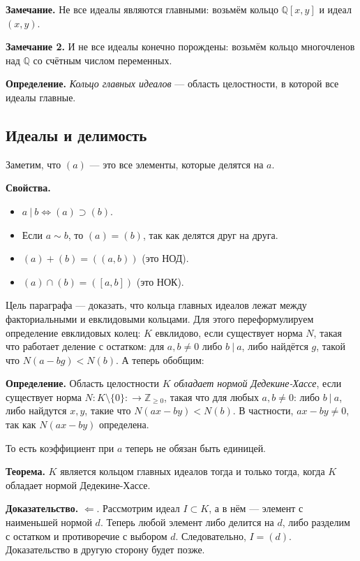 \textbf{Замечание.} Не все идеалы являются главными: возьмём кольцо $\mathbb Q[x, y]$ и идеал $(x, y)$.

\textbf{Замечание 2.} И не все идеалы конечно порождены: возьмём кольцо многочленов над $\mathbb Q$ со счётным числом переменных.

\textbf{Определение.} \textit{Кольцо главных идеалов} --- область целостности, в которой все идеалы главные.

\subsection{Идеалы и делимость}
Заметим, что $(a)$ --- это все элементы, которые делятся на $a$.

\textbf{Свойства.}
\begin{itemize}
    \item $a~|~b \iff (a) \supset (b)$.
    \item Если $a \sim b$, то $(a) = (b)$, так как делятся друг на друга.
    \item $(a) + (b) = ((a, b))$ (это НОД).
    \item $(a) \cap (b) = ([a, b])$ (это НОК).
\end{itemize}

Цель параграфа --- доказать, что кольца главных идеалов лежат между факториальными и евклидовыми кольцами.
Для этого переформулируем определение евклидовых колец: $K$ евклидово, если существует норма $N$, такая что работает деление с остатком: для $a, b \ne 0$ либо $b~|~a$, либо найдётся $g$, такой что $N(a - bg) < N(b)$.
А теперь обобщим:

\textbf{Определение.} Область целостности $K$ \textit{обладает нормой Дедекине-Хассе}, если существует норма $N: K \setminus \{0\}: \to \mathbb Z_{\ge 0}$, такая что для любых $a, b \ne 0$: либо $b~|~a$, либо найдутся $x, y$, такие что $N(ax - by) < N(b)$.
В частности, $ax - by \ne 0$, так как $N(ax - by)$ определена.

То есть коэффициент при $a$ теперь не обязан быть единицей.

\textbf{Теорема.} $K$ является кольцом главных идеалов тогда и только тогда, когда $K$ обладает нормой Дедекине-Хассе.

\textbf{Доказательство.} $\Leftarrow$. Рассмотрим идеал $I \subset K$, а в нём --- элемент с наименьшей нормой $d$.
Теперь любой элемент либо делится на $d$, либо разделим с остатком и противоречие с выбором $d$.
Следовательно, $I = (d)$.
Доказательство в другую сторону будет позже.

